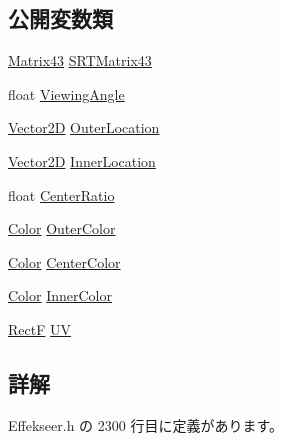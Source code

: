 \subsection*{公開変数類}
\begin{DoxyCompactItemize}
\item 
\mbox{\hyperlink{struct_effekseer_1_1_matrix43}{Matrix43}} \mbox{\hyperlink{struct_effekseer_1_1_ring_renderer_1_1_instance_parameter_abf4c46b9d970713d7b0b24937b0068aa}{S\+R\+T\+Matrix43}}
\item 
float \mbox{\hyperlink{struct_effekseer_1_1_ring_renderer_1_1_instance_parameter_a6190409d348a699ca3959fb9416ad0a3}{Viewing\+Angle}}
\item 
\mbox{\hyperlink{struct_effekseer_1_1_vector2_d}{Vector2D}} \mbox{\hyperlink{struct_effekseer_1_1_ring_renderer_1_1_instance_parameter_a4cec1a47e29e3223e61b9ca6321ea418}{Outer\+Location}}
\item 
\mbox{\hyperlink{struct_effekseer_1_1_vector2_d}{Vector2D}} \mbox{\hyperlink{struct_effekseer_1_1_ring_renderer_1_1_instance_parameter_a968473abb25d344fc44f94c932778118}{Inner\+Location}}
\item 
float \mbox{\hyperlink{struct_effekseer_1_1_ring_renderer_1_1_instance_parameter_ac6d815e9e994b7cd7aed0a10ac27fa83}{Center\+Ratio}}
\item 
\mbox{\hyperlink{struct_effekseer_1_1_color}{Color}} \mbox{\hyperlink{struct_effekseer_1_1_ring_renderer_1_1_instance_parameter_a1ec6e9ee1f8609946d311f32775b94e5}{Outer\+Color}}
\item 
\mbox{\hyperlink{struct_effekseer_1_1_color}{Color}} \mbox{\hyperlink{struct_effekseer_1_1_ring_renderer_1_1_instance_parameter_a09f1fa6d5c759274a99f7989d91ac247}{Center\+Color}}
\item 
\mbox{\hyperlink{struct_effekseer_1_1_color}{Color}} \mbox{\hyperlink{struct_effekseer_1_1_ring_renderer_1_1_instance_parameter_ab6b70b8bbd4afb32a90dbc30789519dd}{Inner\+Color}}
\item 
\mbox{\hyperlink{struct_effekseer_1_1_rect_f}{RectF}} \mbox{\hyperlink{struct_effekseer_1_1_ring_renderer_1_1_instance_parameter_a827916d62b80594e49b2b521df6ca822}{UV}}
\end{DoxyCompactItemize}


\subsection{詳解}


 Effekseer.\+h の 2300 行目に定義があります。



